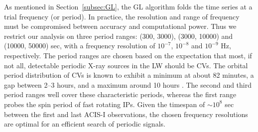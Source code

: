 \documentclass[fleqn,usenatbib]{mnras}
\begin{document}
As mentioned in Section~\ref{subsec:GL}, the GL algorithm folds the time series at a trial frequency (or period). 
In practice, the resolution and range of frequency must be compromised between accuracy and computational power. %
Thus we restrict our analysis on three period ranges: (300, 3000), (3000, 10000) and (10000, 50000) sec, with a frequency resolution of $10^{-7}$, $10^{-8}$ and $10^{-9}$ Hz, respectively. 
The period ranges are chosen based on the expectation that most, if not all, detectable periodic X-ray sources in the LW should be CVs. 
The orbital period distribution of CVs is known to exhibit a minimum at about 82 minutes, a gap between 2--3 hours, and a maximum around 10 hours \citep{2003A&A...404..301R}. 
The second and third period ranges well cover these characteristic periods, whereas the first range probes the spin period of fast rotating IPs.
Given the timespan of $\sim10^8$ sec between the first and last ACIS-I observations, the chosen frequency resolutions are optimal for an efficient search of periodic signals.  
\end{document}
